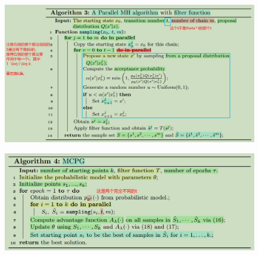 \begin{figure}
    \centering
    \includegraphics[width=1\linewidth]{Images/MCPG_ALG_3.png}
\end{figure}

\begin{figure}
    \centering
    \includegraphics[width=1\linewidth]{Images/MCPG-ALG-4.png}
\end{figure}

